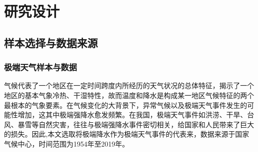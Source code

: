 \chapter{研究设计}\label{chap:3}
\section{样本选择与数据来源}
\subsection{极端天气样本与数据}\label{sec:def}

气候代表了一个地区在一定时间跨度内所经历的天气状况的总体特征，揭示了一个地区的基本气象冷热、干湿特性，故而温度和降水是构成某一地区气候特征的两个最根本的气象要素\citep{alexander2006global}。在气候变化的大背景下，异常气候以及极端天气事件发生的可能性增加\citep{aigner2023summary,donat2017addendum}，这其中极端强降水愈发频繁\citep{trenberth2010relationships}。在我国，极端天气事件如洪涝、干旱、台风、暴雪等自然灾害\citep{尹红2019基于}，往往与极端强降水事件密切相关，给国家和人民带来了巨大的损失。因此,本文选取将极端降水作为极端天气事件的代表来，数据来源于国家气候中心，时间范围为1954年至2019年。

